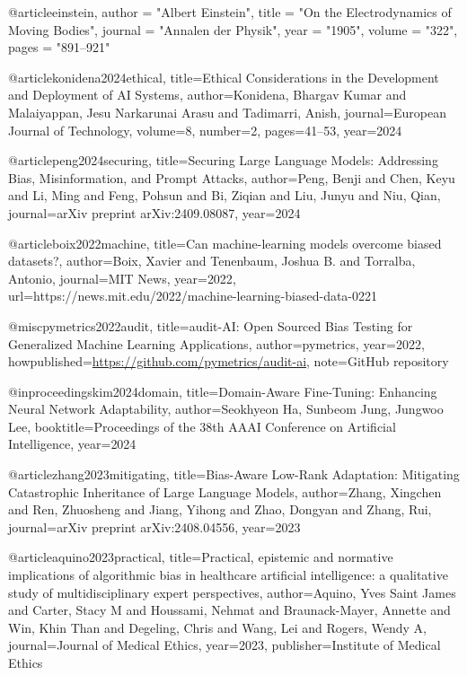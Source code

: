 @article{einstein,
    author = "Albert Einstein",
    title = "On the Electrodynamics of Moving Bodies",
    journal = "Annalen der Physik",
    year = "1905",
    volume = "322",
    pages = "891--921"
}

@article{konidena2024ethical,
  title={Ethical Considerations in the Development and Deployment of AI Systems},
  author={Konidena, Bhargav Kumar and Malaiyappan, Jesu Narkarunai Arasu and Tadimarri, Anish},
  journal={European Journal of Technology},
  volume={8},
  number={2},
  pages={41--53},
  year={2024}
}

@article{peng2024securing,
  title={Securing Large Language Models: Addressing Bias, Misinformation, and Prompt Attacks},
  author={Peng, Benji and Chen, Keyu and Li, Ming and Feng, Pohsun and Bi, Ziqian and Liu, Junyu and Niu, Qian},
  journal={arXiv preprint arXiv:2409.08087},
  year={2024}
}

@article{boix2022machine,
  title={Can machine-learning models overcome biased datasets?},
  author={Boix, Xavier and Tenenbaum, Joshua B. and Torralba, Antonio},
  journal={MIT News},
  year={2022},
  url={https://news.mit.edu/2022/machine-learning-biased-data-0221}
}

@misc{pymetrics2022audit,
  title={audit-AI: Open Sourced Bias Testing for Generalized Machine Learning Applications},
  author={pymetrics},
  year={2022},
  howpublished={\url{https://github.com/pymetrics/audit-ai}},
  note={GitHub repository}
}

@inproceedings{kim2024domain,
  title={Domain-Aware Fine-Tuning: Enhancing Neural Network Adaptability},
  author={Seokhyeon Ha, Sunbeom Jung, Jungwoo Lee},
  booktitle={Proceedings of the 38th AAAI Conference on Artificial Intelligence},
  year={2024}
}

@article{zhang2023mitigating,
  title={Bias-Aware Low-Rank Adaptation: Mitigating Catastrophic Inheritance of Large Language Models},
  author={Zhang, Xingchen and Ren, Zhuosheng and Jiang, Yihong and Zhao, Dongyan and Zhang, Rui},
  journal={arXiv preprint arXiv:2408.04556},
  year={2023}
}

@article{aquino2023practical,
  title={Practical, epistemic and normative implications of algorithmic bias in healthcare artificial intelligence: a qualitative study of multidisciplinary expert perspectives},
  author={Aquino, Yves Saint James and Carter, Stacy M and Houssami, Nehmat and Braunack-Mayer, Annette and Win, Khin Than and Degeling, Chris and Wang, Lei and Rogers, Wendy A},
  journal={Journal of Medical Ethics},
  year={2023},
  publisher={Institute of Medical Ethics}
}

